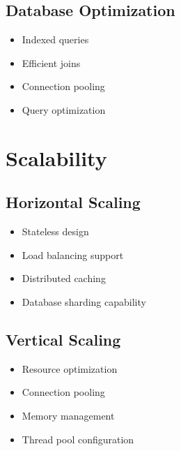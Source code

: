 \subsection{Database Optimization}
\begin{itemize}
    \item Indexed queries
    \item Efficient joins
    \item Connection pooling
    \item Query optimization
\end{itemize}

\section{Scalability}

\subsection{Horizontal Scaling}
\begin{itemize}
    \item Stateless design
    \item Load balancing support
    \item Distributed caching
    \item Database sharding capability
\end{itemize}

\subsection{Vertical Scaling}
\begin{itemize}
    \item Resource optimization
    \item Connection pooling
    \item Memory management
    \item Thread pool configuration
\end{itemize} 